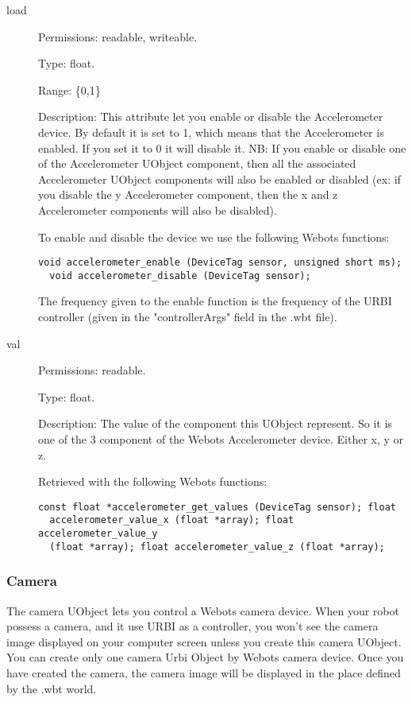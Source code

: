 \noindent
\begin{description}
\item[{load}] Permissions: readable, writeable.


  Type: float.


  Range: \{0,1\}


  Description: This attribute let you enable or disable the
  Accelerometer device.  By default it is set to 1, which means that
  the Accelerometer is enabled. If you set it to 0 it will disable
  it. NB: If you enable or disable one of the Accelerometer UObject
  component, then all the associated Accelerometer UObject components
  will also be enabled or disabled (ex: if you disable the y
  Accelerometer component, then the x and z Accelerometer components
  will also be disabled).


  To enable and disable the device we use the following Webots
  functions:


\begin{lstlisting}[firstnumber=1,]
  void accelerometer_enable (DeviceTag sensor, unsigned short ms);
  void accelerometer_disable (DeviceTag sensor);
\end{lstlisting}

The frequency given to the enable function is the frequency of the
URBI controller (given in the "controllerArgs" field in the .wbt
file).

\item[{ val }] Permissions: readable.


  Type: float.


  Description: The value of the component this UObject represent. So
  it is one of the 3 component of the Webots Accelerometer
  device. Either x, y or z.


  Retrieved with the following Webots functions:


\begin{lstlisting}[firstnumber=1,]
  const float *accelerometer_get_values (DeviceTag sensor); float
  accelerometer_value_x (float *array); float accelerometer_value_y
  (float *array); float accelerometer_value_z (float *array);
\end{lstlisting}
\end{description}

\subsubsection{Camera}
\label{webots.uobjects.robotdevices.camera}%

   The camera UObject lets you control a Webots camera device. When your robot
  possess a camera, and it use
  URBI as a controller, you won't see the camera image displayed on your computer
  screen unless you create this camera UObject. You can create only one
  camera Urbi Object by Webots camera device. Once you have created the camera,
  the camera image will be displayed in the place defined by the .wbt world.


